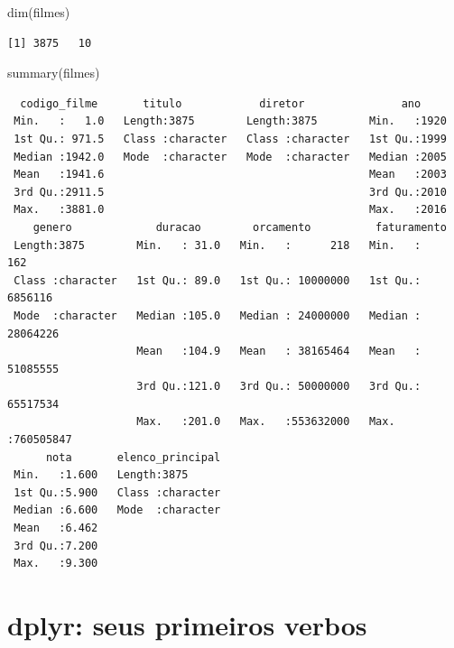\documentclass[
  letterpaper,
]{scrbook}
\newenvironment{Shaded}{\begin{snugshade}}{\end{snugshade}}
\newcommand{\FunctionTok}[1]{\textcolor[rgb]{0.28,0.35,0.67}{#1}}
\newcommand{\NormalTok}[1]{\textcolor[rgb]{0.00,0.23,0.31}{#1}}
\begin{document}
\begin{Shaded}
\begin{Highlighting}[]
\FunctionTok{dim}\NormalTok{(filmes)}
\end{Highlighting}
\end{Shaded}

\begin{verbatim}
[1] 3875   10
\end{verbatim}

\begin{Shaded}
\begin{Highlighting}[]
\FunctionTok{summary}\NormalTok{(filmes)}
\end{Highlighting}
\end{Shaded}

\begin{verbatim}
  codigo_filme       titulo            diretor               ano      
 Min.   :   1.0   Length:3875        Length:3875        Min.   :1920  
 1st Qu.: 971.5   Class :character   Class :character   1st Qu.:1999  
 Median :1942.0   Mode  :character   Mode  :character   Median :2005  
 Mean   :1941.6                                         Mean   :2003  
 3rd Qu.:2911.5                                         3rd Qu.:2010  
 Max.   :3881.0                                         Max.   :2016  
    genero             duracao        orcamento          faturamento       
 Length:3875        Min.   : 31.0   Min.   :      218   Min.   :      162  
 Class :character   1st Qu.: 89.0   1st Qu.: 10000000   1st Qu.:  6856116  
 Mode  :character   Median :105.0   Median : 24000000   Median : 28064226  
                    Mean   :104.9   Mean   : 38165464   Mean   : 51085555  
                    3rd Qu.:121.0   3rd Qu.: 50000000   3rd Qu.: 65517534  
                    Max.   :201.0   Max.   :553632000   Max.   :760505847  
      nota       elenco_principal  
 Min.   :1.600   Length:3875       
 1st Qu.:5.900   Class :character  
 Median :6.600   Mode  :character  
 Mean   :6.462                     
 3rd Qu.:7.200                     
 Max.   :9.300                     
\end{verbatim}

\section*{dplyr: seus primeiros
verbos}\label{dplyr-seus-primeiros-verbos}

\end{document}
